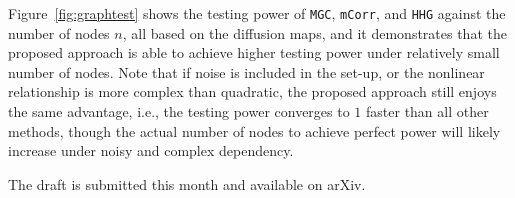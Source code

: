 \documentclass[simplex.tex]{subfiles}
\begin{document}
Figure~\ref{fig:graphtest} shows the testing power of \texttt{MGC}, \texttt{mCorr}, and \texttt{HHG} against the number of nodes $n$, all based on the diffusion maps, and it demonstrates that the proposed approach is able to achieve higher testing power under relatively small number of nodes. Note that if noise is included in the set-up, or the nonlinear relationship is more complex than quadratic, the proposed approach still enjoys the same advantage, i.e., the testing power converges to $1$ faster than all other methods, though the actual number of nodes to achieve perfect power will likely increase under noisy and complex dependency.

The draft is submitted this month and available on arXiv.


\clearpage
\end{document}
